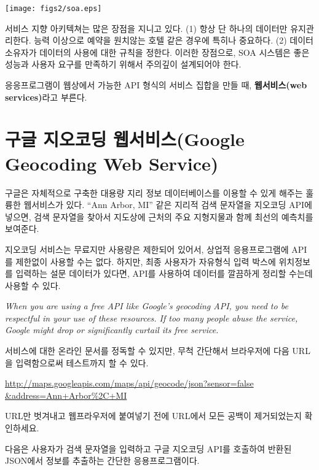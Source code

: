 \beforefig
\centerline{\texttt{[image: figs2/soa.eps]}}
\afterfig

서비스 지향 아키텍쳐는 많은 장점을 지니고 있다. (1) 항상 단 하나의 데이터만 유지관리한다. 
능력 이상으로 예약을 원치않는 호텔  같은 경우에 특히나 중요하다. (2) 데이터 소유자가 
데이터의 사용에 대한 규칙을 정한다. 이러한 장점으로, SOA 시스템은 좋은 성능과 사용자 요구를 만족하기 위해서
주의깊이 설계되어야 한다. 

응응프로그램이 웹상에서 가능한 API 형식의 서비스 집합을 만들 때, {\bf 웹서비스(web services)}라고 부른다.

\section{구글 지오코딩 웹서비스(Google Geocoding Web Service)}

구글은 자체적으로 구축한 대용량 지리 정보 데이터베이스를 이용할 수 있게 해주는 훌륭한 웹서비스가 있다.
``Ann Arbor, MI'' 같은 지리적 검색 문자열을 지오코딩 API에 넣으면, 
검색 문자열을 찾아서 지도상에 근처의 주요 지형지물과 함께 최선의 예측치를 보여준다. 

지오코딩 서비스는 무료지만 사용량은 제한되어 있어서, 상업적 응용프로그램에 API를 제한없이 사용할 수는 없다.
하지만, 최종 사용자가 자유형식 입력 박스에 위치정보를 입력하는 설문 데이터가 있다면,
API를 사용하여 데이터를 깔끔하게 정리할 수는데 사용할 수 있다.

{\em When you are using a free API like Google's geocoding API, you need
to be respectful in your use of these resources.  If too many people abuse the
service, Google might drop or significantly curtail its free service.}

서비스에 대한 온라인 문서를 정독할 수 있지만, 무척 간단해서 브라우저에 다음 URL을 입력함으로써 테스트까지 할 수 있다.

\url{http://maps.googleapis.com/maps/api/geocode/json?sensor=false &address=Ann+Arbor%2C+MI}

URL만 벗겨내고 웹프라우저에 붙여넣기 전에 URL에서 모든 공백이 제거되었는지 확인하세요.

다음은 사용자가 검색 문자열을 입력하고 구글 지오코딩 API를 호출하여 반환된 JSON에서 정보를 추출하는 
간단한 응용프로그램이다.

